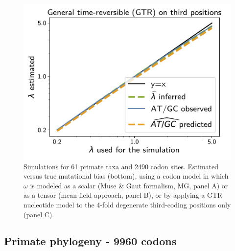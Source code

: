 \documentclass{article}
\begin{document}
\begin{figure}[!htb]
    \begin{minipage}{0.325\linewidth}
        \includegraphics[width=\linewidth, page=1]{inference_supp_mat/PrimatesExons5Mu1.0_lambda_GTR.pdf}
    \end{minipage}
    \hfill
    \caption[Estimation of mutational bias]{
        Simulations for 61 primate taxa and 2490 codon sites.
        Estimated versus true mutational bias (bottom), using a codon model in which $\omega$ is modeled as a scalar (Muse \& Gaut formalism, MG, panel A) or as a tensor (mean-field approach, panel B), or by applying a GTR nucleotide model to the 4-fold degenerate third-coding positions only (panel C).
    }
\end{figure}

\subsection{Primate phylogeny - 9960 codons}
\end{document}
